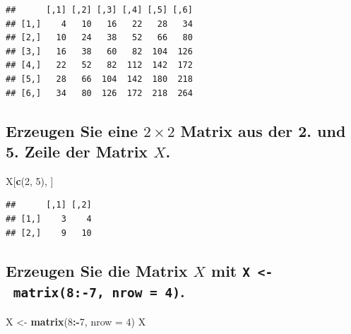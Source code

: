 \documentclass[12pt,a4paper]{article}
\newenvironment{Shaded}{\begin{snugshade}}{\end{snugshade}}
\newcommand{\AttributeTok}[1]{\textcolor[rgb]{0.13,0.29,0.53}{#1}}
\newcommand{\DecValTok}[1]{\textcolor[rgb]{0.00,0.00,0.81}{#1}}
\newcommand{\FunctionTok}[1]{\textcolor[rgb]{0.13,0.29,0.53}{\textbf{#1}}}
\newcommand{\NormalTok}[1]{#1}
\newcommand{\OtherTok}[1]{\textcolor[rgb]{0.56,0.35,0.01}{#1}}
\newcommand{\SpecialCharTok}[1]{\textcolor[rgb]{0.81,0.36,0.00}{\textbf{#1}}}
\begin{document}
\begin{verbatim}
##      [,1] [,2] [,3] [,4] [,5] [,6]
## [1,]    4   10   16   22   28   34
## [2,]   10   24   38   52   66   80
## [3,]   16   38   60   82  104  126
## [4,]   22   52   82  112  142  172
## [5,]   28   66  104  142  180  218
## [6,]   34   80  126  172  218  264
\end{verbatim}

\vspace{0.5cm}

\hypertarget{erzeugen-sie-eine-2-times-2-matrix-aus-der-2.-und-5.-zeile-der-matrix-x.}{%
\subsection{\texorpdfstring{Erzeugen Sie eine \(2 \times 2\) Matrix aus
der 2. und 5. Zeile der Matrix
\(X\).}{Erzeugen Sie eine 2 \textbackslash times 2 Matrix aus der 2. und 5. Zeile der Matrix X.}}\label{erzeugen-sie-eine-2-times-2-matrix-aus-der-2.-und-5.-zeile-der-matrix-x.}}

\begin{Shaded}
\begin{Highlighting}[]
\NormalTok{    X[}\FunctionTok{c}\NormalTok{(}\DecValTok{2}\NormalTok{, }\DecValTok{5}\NormalTok{), ]}
\end{Highlighting}
\end{Shaded}

\begin{verbatim}
##      [,1] [,2]
## [1,]    3    4
## [2,]    9   10
\end{verbatim}

\vspace{0.5cm}

\hypertarget{erzeugen-sie-die-matrix-x-mit-x---matrix8-7-nrow-4.}{%
\subsection{\texorpdfstring{Erzeugen Sie die Matrix \(X\) mit
\texttt{X\ \textless{}-\ matrix(8:-7,\ nrow\ =\ 4)}.}{Erzeugen Sie die Matrix X mit X \textless- matrix(8:-7, nrow = 4).}}\label{erzeugen-sie-die-matrix-x-mit-x---matrix8-7-nrow-4.}}

\begin{Shaded}
\begin{Highlighting}[]
\NormalTok{    X }\OtherTok{\textless{}{-}} \FunctionTok{matrix}\NormalTok{(}\DecValTok{8}\SpecialCharTok{:{-}}\DecValTok{7}\NormalTok{, }\AttributeTok{nrow =} \DecValTok{4}\NormalTok{)}
\NormalTok{    X}
\end{Highlighting}
\end{Shaded}
\end{document}
